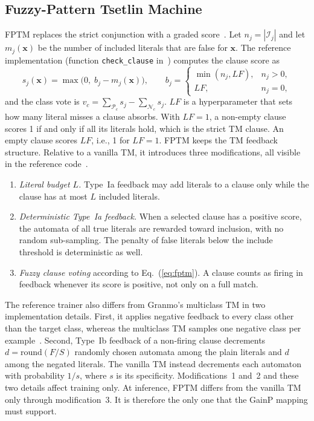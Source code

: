 \documentclass[preprint,review,12pt]{elsarticle}
\newcommand{\gainp}{GainP}
\newcommand{\LF}{\mathit{LF}}
\begin{document}
\subsection{Fuzzy-Pattern Tsetlin Machine}
FPTM replaces the strict conjunction with a graded score~\cite{hnilov2025fptm,hnilov2025code}.
Let $n_j=|\mathcal{I}_j|$ and let $m_j(\mathbf{x})$ be the number of included literals that are false for $\mathbf{x}$.
The reference implementation (function \texttt{check\_clause} in~\cite{hnilov2025code}) computes the clause score as
\begin{equation}\label{eq:fptm}
s_j(\mathbf{x}) = \max\bigl(0,\; b_j - m_j(\mathbf{x})\bigr),\qquad
b_j = \begin{cases} \min(n_j, \LF), & n_j>0,\\ \LF, & n_j=0,\end{cases}
\end{equation}
and the class vote is $v_c=\sum_{\mathcal{P}_c}s_j-\sum_{\mathcal{N}_c}s_j$.
$\LF$ is a hyperparameter that sets how many literal misses a clause absorbs.
With $\LF=1$, a non-empty clause scores 1 if and only if all its literals hold, which is the strict TM clause. An empty clause scores $\LF$, i.e., 1 for $\LF=1$.
FPTM keeps the TM feedback structure.
Relative to a vanilla TM, it introduces three modifications, all visible in the reference code~\cite{hnilov2025code}.
\begin{enumerate}
\item \emph{Literal budget $L$.} Type~Ia feedback may add literals to a clause only while the clause has at most $L$ included literals.
\item \emph{Deterministic Type~Ia feedback.} When a selected clause has a positive score, the automata of all true literals are rewarded toward inclusion, with no random sub-sampling. The penalty of false literals below the include threshold is deterministic as well.
\item \emph{Fuzzy clause voting} according to Eq.~(\ref{eq:fptm}). A clause counts as firing in feedback whenever its score is positive, not only on a full match.
\end{enumerate}
The reference trainer also differs from Granmo's multiclass TM in two implementation details.
First, it applies negative feedback to every class other than the target class, whereas the multiclass TM samples one negative class per example~\cite{granmo2018tsetlin}.
Second, Type~Ib feedback of a non-firing clause decrements $d=\mathrm{round}(F/S)$ randomly chosen automata among the plain literals and $d$ among the negated literals. The vanilla TM instead decrements each automaton with probability $1/s$, where $s$ is its specificity.
Modifications~1 and~2 and these two details affect training only.
At inference, FPTM differs from the vanilla TM only through modification~3. It is therefore the only one that the \gainp{} mapping must support.
\end{document}
